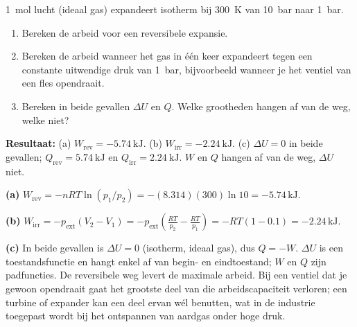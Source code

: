 \begin{oefening}
\SI{1}{\mole} lucht (ideaal gas) expandeert isotherm bij \SI{300}{\kelvin} van \SI{10}{\bar} naar \SI{1}{\bar}.
\begin{enumerate}
\item[(a)] Bereken de arbeid voor een reversibele expansie.
\item[(b)] Bereken de arbeid wanneer het gas in \'e\'en keer expandeert tegen een constante uitwendige druk van \SI{1}{\bar}, bijvoorbeeld wanneer je het ventiel van een fles opendraait.
\item[(c)] Bereken in beide gevallen $\Delta U$ en $Q$. Welke grootheden hangen af van de weg, welke niet?
\end{enumerate}
\end{oefening}
\begin{oplossing}
\textbf{Resultaat:} (a) $W_{\text{rev}} = \SI{-5.74}{\kilo\joule}$. (b) $W_{\text{irr}} = \SI{-2.24}{\kilo\joule}$. (c) $\Delta U = 0$ in beide gevallen; $Q_{\text{rev}} = \SI{+5.74}{\kilo\joule}$ en $Q_{\text{irr}} = \SI{+2.24}{\kilo\joule}$. $W$ en $Q$ hangen af van de weg, $\Delta U$ niet.

\textbf{(a)} $W_{\text{rev}} = -nRT\ln(p_1/p_2) = -(8.314)(300)\ln 10 = -5.74\,\mathrm{kJ}$.

\textbf{(b)} $W_{\text{irr}} = -p_{\text{ext}}(V_2 - V_1) = -p_{\text{ext}}\left(\frac{RT}{p_2} - \frac{RT}{p_1}\right) = -RT(1 - 0.1) = -2.24\,\mathrm{kJ}$.

\textbf{(c)} In beide gevallen is $\Delta U = 0$ (isotherm, ideaal gas), dus $Q = -W$. $\Delta U$ is een toestandsfunctie en hangt enkel af van begin- en eindtoestand; $W$ en $Q$ zijn padfuncties. De reversibele weg levert de maximale arbeid. Bij een ventiel dat je gewoon opendraait gaat het grootste deel van die arbeidscapaciteit verloren; een turbine of expander kan een deel ervan w\'el benutten, wat in de industrie toegepast wordt bij het ontspannen van aardgas onder hoge druk.
\end{oplossing}

